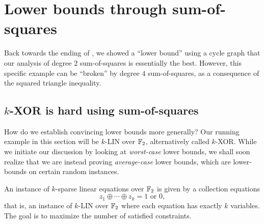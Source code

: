 
\clearpage

\section{Lower bounds through sum-of-squares}
\label{sec:lower-bounds}

Back towards the ending of , we showed a ``lower bound'' using a cycle graph that our analysis of degree $2$ sum-of-squares is essentially the best. However, this specific example can be ``broken'' by degree $4$ sum-of-squares, as a consequence of the squared triangle inequality.

\subsection{$k$-XOR is hard using sum-of-squares}

	How do we establish convincing lower bounds more generally? Our running example in this section will be $k$-LIN over $\mathbb{F}_2$, alternatively called $k$-XOR. While we initiate our discussion by looking at \emph{worst-case} lower bounds, we shall soon realize that we are instead proving \emph{average-case} lower bounds, which are lower-bounds on certain random instances.\\

	\begin{fdef}
		An instance of $k$-sparse linear equations over $\mathbb{F}_2$ is given by a collection equations
		\[ z_1 \oplus \cdots \oplus z_k = 1 \text{ or } 0, \]
		that is, an instance of $k$-LIN over $\mathbb{F}_2$ where each equation has exactly $k$ variables. The goal is to maximize the number of satisfied constraints.
	\end{fdef}

